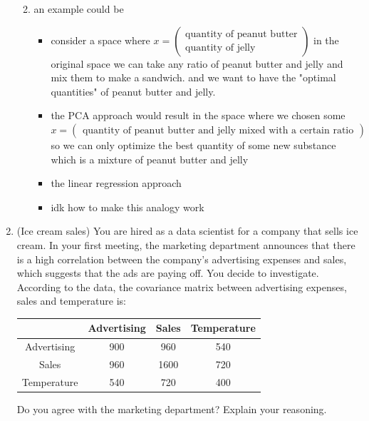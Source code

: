 \documentclass[12pt,twoside]{article}
\begin{document}
\begin{enumerate}
\begin{enumerate}
\begin{itemize}
    \end{itemize}
    \item an example could be 
    \begin{itemize}
    \item consider a space where $x = \begin{pmatrix}
        \text{quantity of peanut butter}\\ \text{quantity of jelly}
    \end{pmatrix}$  in the original space we can take any ratio of peanut butter and jelly and mix them to make a sandwich. and we want to have the "optimal quantities" of peanut butter and jelly. 
    \item the PCA approach would result in the space where we chosen some  \\  $x = \begin{pmatrix}
        \text{quantity of peanut butter and jelly mixed with a certain ratio}
    \end{pmatrix}$ so we can only optimize the best quantity of some new substance which is a mixture of peanut butter and jelly 
    \item the linear regression approach
    \item idk how to make this analogy work 
    \end{itemize}
\end{enumerate}



\newpage
\item (Ice cream sales) You are hired as a data scientist for a company that sells ice cream. In your first meeting, the marketing department announces that there is a high correlation between the company's advertising expenses and sales, which suggests that the ads are paying off. You decide to investigate. According to the data, the covariance matrix between advertising expenses, sales and temperature is:
\begin{center}
\begingroup
\renewcommand*{\arraystretch}{1.5}
{
\begin{tabular}{ |c|c|c|c| } 
\hline & Advertising & Sales & Temperature\\
 \hline
 Advertising & 900 & 960 & 540 \\ 
 \hline
 Sales & 960 &  1600 & 720  \\ 
 \hline
 Temperature& 540  & 720 & 400 \\ 
 \hline
\end{tabular}
}
\endgroup
\end{center}
Do you agree with the marketing department? Explain your reasoning.


\end{enumerate}
\end{document}
